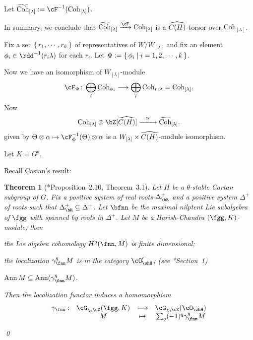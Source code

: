 \documentclass[12pt,a4paper]{amsart}
\DeclareMathOperator{\Ann}{Ann}
\numberwithin{equation}{section}
\newtheorem{thm}{Theorem}[section]
\theoremstyle{remark}
\def\Coh{\mathrm{Coh}}
\begin{document}
\def\tCoh{\widetilde{\Coh}}
Let $\tCoh_{[\lambda]}:= \cF^{-1}(\Coh_{[\lambda]})$.

In summary, we conclude that
$
\tCoh_{[\lambda]}\xrightarrow{\cF} \Coh_{[\lambda]}
$
is a $\widehat{C(H)}$-torsor over $\Coh_{[\lambda]}$.

Fix a set $\set{r_{1}, \cdots, r_{k}}$ of representatives of
$W/W_{[\lambda]}$ and fix
an element $\phi_{i}\in \rdd^{-1}(r_{i}\lambda)$ for each $r_{i}$.
Let $\Phi := \set{\phi_{i}|i=1, 2, \cdots, k}$.

Now we have an isomorphism of $W_{[\lambda]}$-module
\[
  \cF_{\Phi}\colon \bigoplus_{i}\Coh_{\phi_{i}} \longrightarrow %
  \bigoplus_{i} \Coh_{r_{i}\lambda} = \Coh_{[\lambda]}.
\]
Now
\[
  \Coh_{[\lambda]}\otimes \bZ[\whCPH]
  \xrightarrow{\ \ \cong \ \ } \tCoh_{[\lambda]}.
\]
given by $\Theta \otimes \alpha \mapsto
\cF_{\Phi}^{-1}(\Theta)\otimes \alpha$ is a
$W_{[\lambda]}\times \widehat{C(H)}$-module isomorphism.



\medskip
\def\Grt{\cG}
\def\DeltaRp{\Delta^{+}_{\bR}}
\def\approxLR{\substack{LR}{\approx}}
Let $K = G^{\theta}$.


Recall Casian's result:
\begin{thm}[\cite{Cas}*{Proposition~2.10, Theorem~3.1}]\label{thm:L1}
  Let $H$ be a $\theta$-stable Cartan subgroup of $G$.
  Fix a positive system of real roots $\DeltaRp$ and a positive system
  $\Delta^{+}$ of roots such that $\DeltaRp\subseteq \Delta^{+}$.
  Let $\bfnn$ be the maximal nilptent Lie subalgebra of $\fgg$ with spanned
  by roots in $\Delta^{+}$.
 Let $M$  be a Harish-Chandra $(\fgg,K)$-module, then
  \begin{enumT}
    \item the Lie algebra cohomology $H^{q}(\fnn,M)$ is finite dimensional;
    \item
    the localization $\gamma_{\fnn}^{q}M$ is in the category $\cO'_{\whH}$;
    (see \cite{Cas}*{Section~1})
    \item
    $\Ann M \subseteq \Ann (\gamma_{\fnn}^{q}M)$.
    \item
  Then the localization functor induces a homomorphism
  \[
    \begin{array}{cccc}
      \gamma_{\fnn}: &\Grt_{\chi,\cZ}(\fgg,K) &\longrightarrow & \Grt_{\chi,\cZ}(\cO_{\whH})\\
      & M &\mapsto & \sum_{q}  (-1)^{q} \gamma^{q}_{\fnn} M
    \end{array}
  \]
  \end{enumT}
  \qed
\end{thm}
\end{document}
